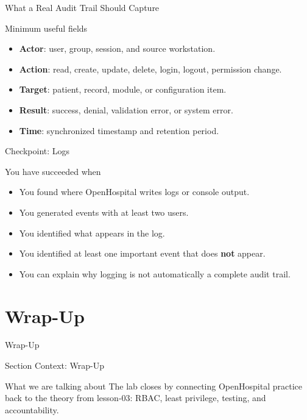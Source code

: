 \documentclass[presentation]{beamer}
\newcommand{\sectiontitleframe}[1]{
\begin{frame}[plain,c]
\begin{center}
{\usebeamerfont{title}\usebeamercolor[fg]{title}#1}
\end{center}
\end{frame}
}
\begin{document}
\begin{frame}[c]{What a Real Audit Trail Should Capture}
\begin{block}{Minimum useful fields}
\begin{itemize}
    \item \textbf{Actor}: user, group, session, and source workstation.
    \item \textbf{Action}: read, create, update, delete, login, logout, permission change.
    \item \textbf{Target}: patient, record, module, or configuration item.
    \item \textbf{Result}: success, denial, validation error, or system error.
    \item \textbf{Time}: synchronized timestamp and retention period.
\end{itemize}
\end{block}
\end{frame}

\begin{frame}[c]{Checkpoint: Logs}
\begin{block}{You have succeeded when}
\begin{itemize}
    \item You found where OpenHospital writes logs or console output.
    \item You generated events with at least two users.
    \item You identified what appears in the log.
    \item You identified at least one important event that does \textbf{not} appear.
    \item You can explain why logging is not automatically a complete audit trail.
\end{itemize}
\end{block}
\end{frame}

\section{Wrap-Up}
\sectiontitleframe{Wrap-Up}

\begin{frame}[c]{Section Context: Wrap-Up}
\begin{block}{What we are talking about}
The lab closes by connecting OpenHospital practice back to the theory from lesson-03: RBAC,
least privilege, testing, and accountability.
\end{block}
\end{frame}
\end{document}

